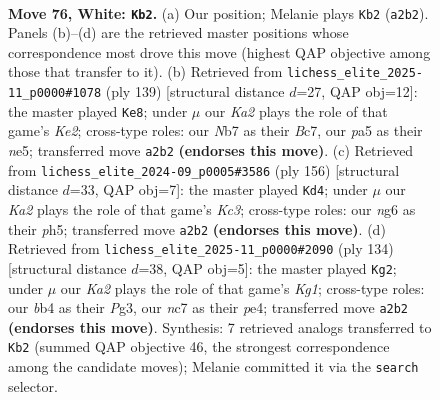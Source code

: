 \documentclass[11pt]{article}
\begin{document}
\clearpage

\begin{figure}[p]\centering
\begin{subfigure}{0.46\textwidth}\centering
\resizebox{\linewidth}{!}{%
\newchessgame
\chessboard[
  setfen={8/1Nn3k1/6n1/p7/Pb1pP3/1P1B3p/K3P3/8 w - - 18 76},
  showmover=false,
  pgfstyle=straightmove, color=movearrow, markmove={a2-b2}
]}
\caption{}
\end{subfigure}\hfill
\begin{subfigure}{0.46\textwidth}\centering
\resizebox{\linewidth}{!}{%
\newchessgame
\chessboard[
  setfen={8/2b1k3/4p3/1n1bN1pp/N3p3/6PP/1B3P2/6K1 b - - 5 70},
  showmover=false,
  pgfstyle=straightmove, color=movearrow, markmove={e7-e8}
]}
\caption{}
\end{subfigure}
\\[4pt]
\begin{subfigure}{0.46\textwidth}\centering
\resizebox{\linewidth}{!}{%
\newchessgame
\chessboard[
  setfen={8/8/p3pBk1/Pb2P2p/1P5P/2K5/8/8 w - - 38 79},
  showmover=false,
  pgfstyle=straightmove, color=movearrow, markmove={c3-d4}
]}
\caption{}
\end{subfigure}\hfill
\begin{subfigure}{0.46\textwidth}\centering
\resizebox{\linewidth}{!}{%
\newchessgame
\chessboard[
  setfen={8/8/bBk5/P6p/4p1p1/4P1P1/5P2/6K1 w - - 14 68},
  showmover=false,
  pgfstyle=straightmove, color=movearrow, markmove={g1-g2}
]}
\caption{}
\end{subfigure}
\caption{\textbf{Move 76, White: \texttt{Kb2}.} (a) Our position; Melanie plays \texttt{Kb2} (\texttt{a2b2}). Panels (b)--(d) are the retrieved master positions whose correspondence most drove this move (highest QAP objective among those that transfer to it). (b) Retrieved from \texttt{lichess\_elite\_2025-11\_p0000\#1078} (ply 139) [structural distance $d$=27, QAP obj=12]: the master played \texttt{Ke8}; under $\mu$ our \emph{Ka2} plays the role of that game's \emph{Ke2}; cross-type roles: our \emph{N}b7 as their \emph{B}c7, our \emph{p}a5 as their \emph{n}e5; transferred move \texttt{a2b2} \textbf{(endorses this move)}. (c) Retrieved from \texttt{lichess\_elite\_2024-09\_p0005\#3586} (ply 156) [structural distance $d$=33, QAP obj=7]: the master played \texttt{Kd4}; under $\mu$ our \emph{Ka2} plays the role of that game's \emph{Kc3}; cross-type roles: our \emph{n}g6 as their \emph{p}h5; transferred move \texttt{a2b2} \textbf{(endorses this move)}. (d) Retrieved from \texttt{lichess\_elite\_2025-11\_p0000\#2090} (ply 134) [structural distance $d$=38, QAP obj=5]: the master played \texttt{Kg2}; under $\mu$ our \emph{Ka2} plays the role of that game's \emph{Kg1}; cross-type roles: our \emph{b}b4 as their \emph{P}g3, our \emph{n}c7 as their \emph{p}e4; transferred move \texttt{a2b2} \textbf{(endorses this move)}. Synthesis: 7 retrieved analogs transferred to \texttt{Kb2} (summed QAP objective 46, the strongest correspondence among the candidate moves); Melanie committed it via the \texttt{search} selector.}
\label{fig:thought-m150}
\end{figure}
\end{document}

